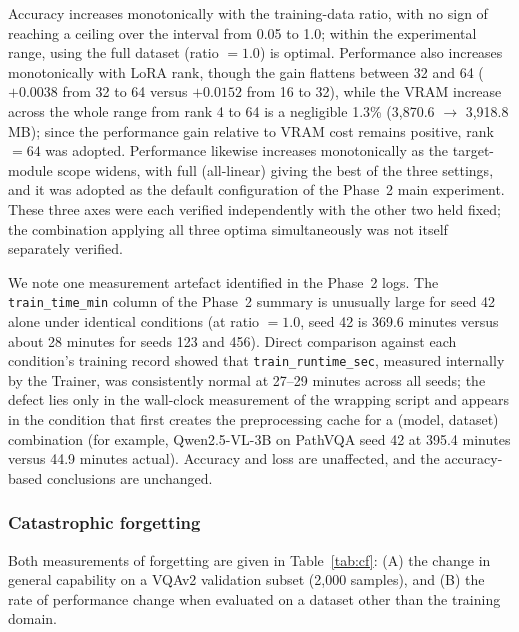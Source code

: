 Accuracy increases monotonically with the training-data ratio, with no sign of
reaching a ceiling over the interval from 0.05 to 1.0; within the experimental
range, using the full dataset (ratio $=1.0$) is optimal. Performance also
increases monotonically with LoRA rank, though the gain flattens between 32 and
64 ($+0.0038$ from 32 to 64 versus $+0.0152$ from 16 to 32), while the VRAM
increase across the whole range from rank 4 to 64 is a negligible 1.3\%
(3,870.6 $\rightarrow$ 3,918.8\,MB); since the performance gain relative to VRAM
cost remains positive, rank $=64$ was adopted. Performance likewise increases
monotonically as the target-module scope widens, with full (all-linear) giving
the best of the three settings, and it was adopted as the default configuration
of the Phase~2 main experiment. These three axes were each verified independently
with the other two held fixed; the combination applying all three optima
simultaneously was not itself separately verified.

We note one measurement artefact identified in the Phase~2 logs. The
\texttt{train\_time\_min} column of the Phase~2 summary is unusually large for
seed 42 alone under identical conditions (at ratio $=1.0$, seed 42 is 369.6
minutes versus about 28 minutes for seeds 123 and 456). Direct comparison against
each condition's training record showed that \texttt{train\_runtime\_sec},
measured internally by the Trainer, was consistently normal at 27--29 minutes
across all seeds; the defect lies only in the wall-clock measurement of the
wrapping script and appears in the condition that first creates the preprocessing
cache for a (model, dataset) combination (for example, Qwen2.5-VL-3B on PathVQA
seed 42 at 395.4 minutes versus 44.9 minutes actual). Accuracy and loss are
unaffected, and the accuracy-based conclusions are unchanged.

\subsubsection{Catastrophic forgetting}

Both measurements of forgetting are given in Table~\ref{tab:cf}: (A) the change
in general capability on a VQAv2 validation subset (2,000 samples), and (B) the
rate of performance change when evaluated on a dataset other than the training
domain.

